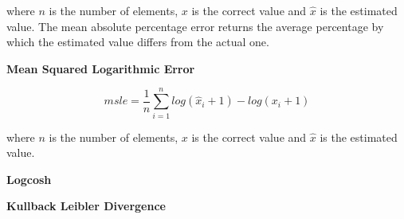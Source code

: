 where $n$ is the number of elements, $x$ is the correct value and $\hat{x}$ is the estimated value. The mean absolute percentage error returns the average percentage by which the estimated value differs from the actual one.

\noindent
\textbf{Mean Squared Logarithmic Error}

\begin{displaymath}
msle = \frac{1}{n} \sum_{i=1}^{n} log(\hat{x}_i + 1) - log(x_i + 1)
\end{displaymath}

where $n$ is the number of elements, $x$ is the correct value and $\hat{x}$ is the estimated value.

\noindent
\textbf{Logcosh}

\noindent
\textbf{Kullback Leibler Divergence}

